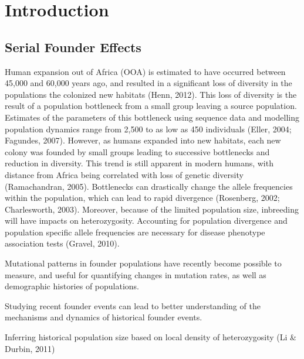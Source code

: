 \documentclass[
11pt, %
oneside, %
english, %
doublespacing, %
headsepline, %
]{MastersDoctoralThesis} %
\begin{document}

\mainmatter %

\pagestyle{thesis} %


\section{Introduction}

\subsection{Serial Founder Effects}
Human expansion out of Africa (OOA) is estimated to have occurred between 45,000 and 60,000 years ago, and resulted in a significant loss of diversity in the populations the colonized new habitats (Henn, 2012). 
This loss of diversity is the result of a population bottleneck from a small group leaving a source population. 
Estimates of the parameters of this bottleneck using sequence data and modelling population dynamics range from 2,500 to as low as 450 individuals (Eller, 2004; Fagundes, 2007).
However, as humans expanded into new habitats, each new colony was founded by small groups leading to successive bottlenecks and reduction in diversity.
This trend is still apparent in modern humans, with distance from Africa being correlated with loss of genetic diversity (Ramachandran, 2005).
Bottlenecks can drastically change the allele frequencies within the population, which can lead to rapid divergence (Rosenberg, 2002; Charlesworth, 2003).
Moreover, because of the limited population size, inbreeding will have impacts on heterozygosity.
Accounting for population divergence and population specific allele frequencies are necessary for disease phenotype association tests (Gravel, 2010).

Mutational patterns in founder populations have recently become possible to measure, and useful for quantifying changes in mutation rates, as well as demographic histories of populations.

Studying recent founder events can lead to better understanding of the mechanisms and dynamics of historical founder events. 

Inferring historical population size based on local density of heterozygosity (Li \& Durbin, 2011)
\end{document}
